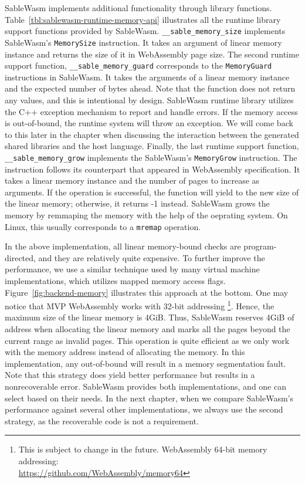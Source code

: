 SableWasm implements additional functionality through library functions. Table~\ref{tbl:sablewasm-runtime-memory-api} illustrates all the runtime library support functions provided by SableWasm. \texttt{\_\_sable\_memory\_size} implements SableWasm's \texttt{MemorySize} instruction. It takes an argument of linear memory instance and returns the size of it in WebAssembly page size. The second runtime support function, \texttt{\_\_sable\_memory\_guard} corresponds to the \texttt{MemoryGuard} instructions in SableWasm. It takes the arguments of a linear memory instance and the expected number of bytes ahead. Note that the function does not return any values, and this is intentional by design. SableWasm runtime library utilizes the C++ exception mechanism to report and handle errors. If the memory access is out-of-bound, the runtime system will throw an exception. We will come back to this later in the chapter when discussing the interaction between the generated shared libraries and the host language. Finally, the last runtime support function, \texttt{\_\_sable\_memory\_grow} implements the SableWasm's \texttt{MemoryGrow} instruction. The instruction follows its counterpart that appeared in WebAssembly specification. It takes a linear memory instance and the number of pages to increase as arguments. If the operation is successful, the function will yield to the new size of the linear memory; otherwise, it returns -1 instead. SableWasm grows the memory by remmaping the memory with the help of the oeprating system. On Linux, this usually corresponds to a \texttt{mremap} operation.

In the above implementation, all linear memory-bound checks are program-directed, and they are relatively quite expensive. To further improve the performance, we use a similar technique used by many virtual machine implementations, which utilizes mapped memory access flags. Figure~\ref{fig:backend-memory} illustrates this approach at the bottom. One may notice that MVP WebAssembly works with 32-bit addressing \footnote{This is subject to change in the future. WebAssembly 64-bit memory addressing:\\\url{https://github.com/WebAssembly/memory64}}. Hence, the maximum size of the linear memory is 4GiB. Thus, SableWasm reserves 4GiB of address when allocating the linear memory and marks all the pages beyond the current range as invalid pages.  This operation is quite efficient as we only work with the memory address instead of allocating the memory. In this implementation, any out-of-bound will result in a memory segmentation fault. Note that this strategy does yield better performance but results in a nonrecoverable error. SableWasm provides both implementations, and one can select based on their needs. In the next chapter, when we compare SableWasm's performance against several other implementations, we always use the second strategy, as the recoverable code is not a requirement.

